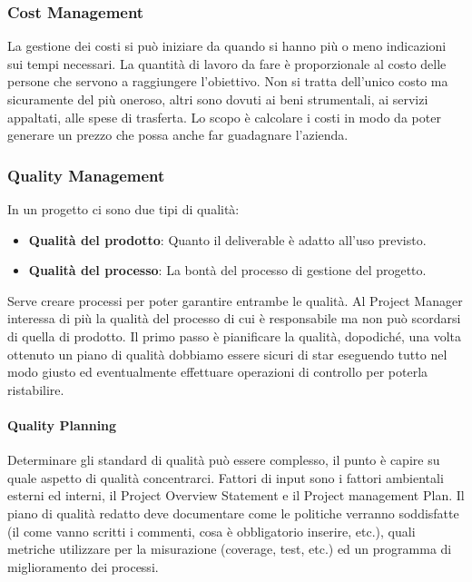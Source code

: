 \subsubsection{Cost Management}
La gestione dei costi si può iniziare da quando si hanno più o meno indicazioni sui tempi necessari. La quantità di lavoro da fare è proporzionale al costo delle persone che servono a raggiungere l'obiettivo. Non si tratta dell'unico costo ma sicuramente del più oneroso, altri sono dovuti ai beni strumentali, ai servizi appaltati, alle spese di trasferta.\newline
Lo scopo è calcolare i costi in modo da poter generare un prezzo che possa anche far guadagnare l'azienda.
\subsubsection{Quality Management}
In un progetto ci sono due tipi di qualità:
\begin{itemize}
	\item \textbf{Qualità del prodotto}: Quanto il deliverable è adatto all'uso previsto.
	\item \textbf{Qualità del processo}: La bontà del processo di gestione del progetto.
\end{itemize}
Serve creare processi per poter garantire entrambe le qualità. Al Project Manager interessa di più la qualità del processo di cui è responsabile ma non può scordarsi di quella di prodotto.\newline
Il primo passo è pianificare la qualità, dopodiché, una volta ottenuto un piano di qualità dobbiamo essere sicuri di star eseguendo tutto nel modo giusto ed eventualmente effettuare operazioni di controllo per poterla ristabilire.
\paragraph{Quality Planning}
Determinare gli standard di qualità può essere complesso, il punto è capire su quale aspetto di qualità concentrarci. Fattori di input sono i fattori ambientali esterni ed interni, il Project Overview Statement e il Project management Plan.\newline
Il piano di qualità redatto deve documentare come le politiche verranno soddisfatte (il come vanno scritti i commenti, cosa è obbligatorio inserire, etc.), quali metriche utilizzare per la misurazione (coverage, test, etc.) ed un programma di miglioramento dei processi.
